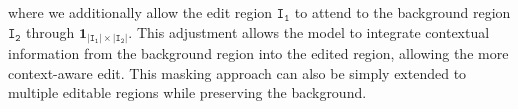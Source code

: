 \documentclass{article}
\begin{document}
where we additionally allow the edit region $\texttt{I}_\texttt{1}$ to attend to the background region $\texttt{I}_\texttt{2}$ through $\mathbf{1}_{|\texttt{I}_\texttt{1}|\times|\texttt{I}_\texttt{2}|}$. This adjustment allows the model to integrate contextual information from the background region into the edited region, allowing the more context-aware edit. This masking approach can also be simply extended to multiple editable regions while preserving the background.

\end{document}
